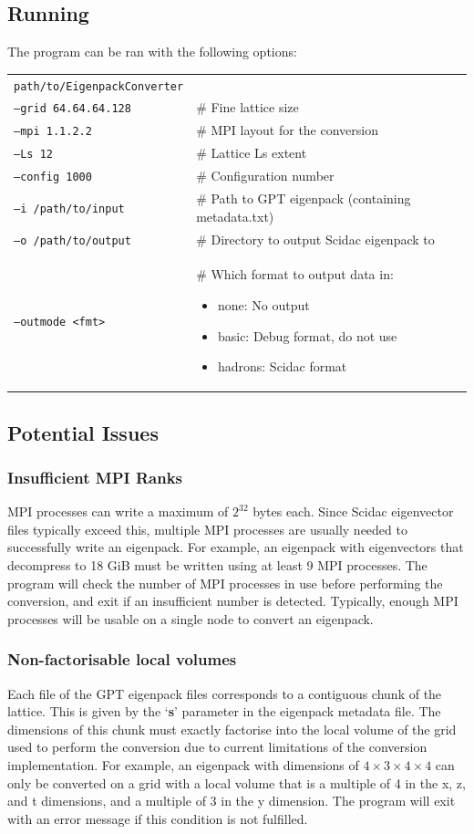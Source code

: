 \documentclass{article}
\begin{document}
\subsection{Running}
The program can be ran with the following options:\\
\begin{tabular}{p{}p{}}
\texttt{path/to/EigenpackConverter} &\\
\texttt{--grid 64.64.64.128} & \# Fine lattice size\\
\texttt{--mpi 1.1.2.2}       & \# MPI layout for the conversion\\
\texttt{--Ls 12}             & \# Lattice Ls extent\\
\texttt{--config 1000}       & \# Configuration number\\
\texttt{--i /path/to/input}  & \# Path to GPT eigenpack (containing metadata.txt)\\
\texttt{--o /path/to/output}  & \# Directory to output Scidac eigenpack to\\
\texttt{--outmode <fmt>} & \# Which format to output data in:
\begin{itemize}
\item none: No output
\item basic: Debug format, do not use
\item hadrons: Scidac format
\end{itemize} 
\end{tabular}

\subsection{Potential Issues}
\subsubsection{Insufficient MPI Ranks}
MPI processes can write a maximum of $2^{32}$ bytes each. Since Scidac eigenvector files typically exceed this, multiple MPI processes are usually needed to successfully write an eigenpack. For example, an eigenpack with eigenvectors that decompress to 18 GiB must be written using at least 9 MPI processes. The program will check the number of MPI processes in use before performing the conversion, and exit if an insufficient number is detected. Typically, enough MPI processes will be usable on a single node to convert an eigenpack.

\subsubsection{Non-factorisable local volumes}
Each file of the GPT eigenpack files corresponds to a contiguous chunk of the lattice. This is given by the `\textbf{s}' parameter in the eigenpack metadata file. The dimensions of this chunk must exactly factorise into the local volume of the grid used to perform the conversion due to current limitations of the conversion implementation. For example, an eigenpack with dimensions of $4\times 3\times 4\times 4$ can only be converted on a grid with a local volume that is a multiple of 4 in the x, z, and t dimensions, and a multiple of 3 in the y dimension. The program will exit with an error message if this condition is not fulfilled.
\end{document}

